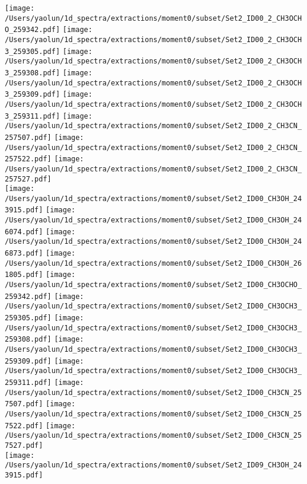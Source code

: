 \begin{figure*}[htbp!]
  \texttt{[image: /Users/yaolun/1d\_spectra/extractions/moment0/subset/Set2\_ID00\_2\_CH3OCHO\_259342.pdf]}
  \texttt{[image: /Users/yaolun/1d\_spectra/extractions/moment0/subset/Set2\_ID00\_2\_CH3OCH3\_259305.pdf]}
  \texttt{[image: /Users/yaolun/1d\_spectra/extractions/moment0/subset/Set2\_ID00\_2\_CH3OCH3\_259308.pdf]}
  \texttt{[image: /Users/yaolun/1d\_spectra/extractions/moment0/subset/Set2\_ID00\_2\_CH3OCH3\_259309.pdf]}
  \texttt{[image: /Users/yaolun/1d\_spectra/extractions/moment0/subset/Set2\_ID00\_2\_CH3OCH3\_259311.pdf]}
  \texttt{[image: /Users/yaolun/1d\_spectra/extractions/moment0/subset/Set2\_ID00\_2\_CH3CN\_257507.pdf]}
  \texttt{[image: /Users/yaolun/1d\_spectra/extractions/moment0/subset/Set2\_ID00\_2\_CH3CN\_257522.pdf]}
  \texttt{[image: /Users/yaolun/1d\_spectra/extractions/moment0/subset/Set2\_ID00\_2\_CH3CN\_257527.pdf]}
  \\
  \texttt{[image: /Users/yaolun/1d\_spectra/extractions/moment0/subset/Set2\_ID00\_CH3OH\_243915.pdf]}
  \texttt{[image: /Users/yaolun/1d\_spectra/extractions/moment0/subset/Set2\_ID00\_CH3OH\_246074.pdf]}
  \texttt{[image: /Users/yaolun/1d\_spectra/extractions/moment0/subset/Set2\_ID00\_CH3OH\_246873.pdf]}
  \texttt{[image: /Users/yaolun/1d\_spectra/extractions/moment0/subset/Set2\_ID00\_CH3OH\_261805.pdf]}
  \texttt{[image: /Users/yaolun/1d\_spectra/extractions/moment0/subset/Set2\_ID00\_CH3OCHO\_259342.pdf]}
  \texttt{[image: /Users/yaolun/1d\_spectra/extractions/moment0/subset/Set2\_ID00\_CH3OCH3\_259305.pdf]}
  \texttt{[image: /Users/yaolun/1d\_spectra/extractions/moment0/subset/Set2\_ID00\_CH3OCH3\_259308.pdf]}
  \texttt{[image: /Users/yaolun/1d\_spectra/extractions/moment0/subset/Set2\_ID00\_CH3OCH3\_259309.pdf]}
  \texttt{[image: /Users/yaolun/1d\_spectra/extractions/moment0/subset/Set2\_ID00\_CH3OCH3\_259311.pdf]}
  \texttt{[image: /Users/yaolun/1d\_spectra/extractions/moment0/subset/Set2\_ID00\_CH3CN\_257507.pdf]}
  \texttt{[image: /Users/yaolun/1d\_spectra/extractions/moment0/subset/Set2\_ID00\_CH3CN\_257522.pdf]}
  \texttt{[image: /Users/yaolun/1d\_spectra/extractions/moment0/subset/Set2\_ID00\_CH3CN\_257527.pdf]}
  \\
  \texttt{[image: /Users/yaolun/1d\_spectra/extractions/moment0/subset/Set2\_ID09\_CH3OH\_243915.pdf]}

\end{figure*}
